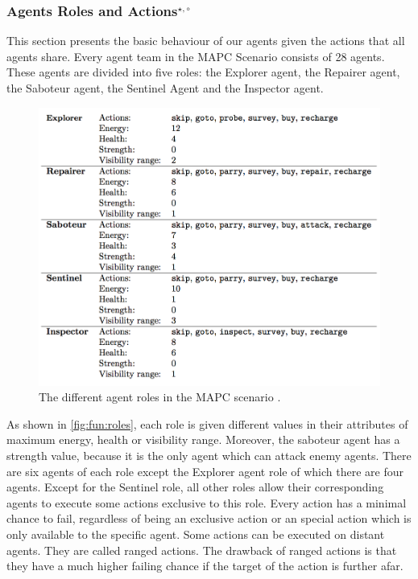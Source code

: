 \subsubsection[Agent Roles and Actions]{Agents Roles and Actions$^{\star,\circ}$}\label{fun:mapc_roles}
This section presents the basic behaviour of our agents given the actions that all agents share.
Every agent team in the MAPC Scenario consists of 28 agents.
These agents are divided into five roles: the Explorer agent, the Repairer agent, the Saboteur agent, the Sentinel Agent and the Inspector agent.
\begin{figure}[ht]
  \centering
  \includegraphics[width=0.9\linewidth]{images/roles.png}
  \caption{The different agent roles in the MAPC scenario \cite{ahlbrecht_mapc_2014}.}
  \label{fig:fun:roles}
\end{figure}
As shown in \autoref{fig:fun:roles}, each role is given different values in their attributes of maximum energy, health or visibility range.
Moreover, the saboteur agent has a strength value, because it is the only agent which can attack enemy agents.
There are six agents of each role except the Explorer agent role of which there are four agents.
Except for the Sentinel role, all other roles allow their corresponding agents to execute some actions exclusive to this role.
Every action has a minimal chance to fail, regardless of being an exclusive action or an special action which is only available to the specific agent.
Some actions can be executed on distant agents. They are called ranged actions.
The drawback of ranged actions is that they have a much higher failing chance if the target of the action is further afar.
